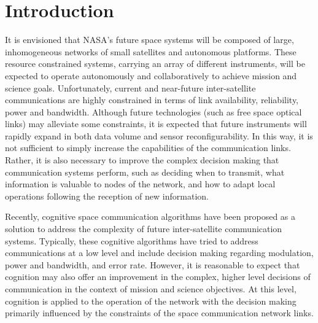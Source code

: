\documentclass[conference]{IEEEtran}
\begin{document}
\section{Introduction}
It is envisioned that NASA's future space systems will be composed of large,
inhomogeneous networks of small satellites and autonomous platforms.  These
resource constrained systems, carrying an array of different instruments, will
be expected to operate autonomously and collaboratively to achieve mission and
science goals.  Unfortunately, current and near-future inter-satellite
communications are highly constrained in terms of link availability,
reliability, power and bandwidth.  Although future technologies (such as free
space optical links) may alleviate some constraints, it is expected that future
instruments will rapidly expand in both data volume and sensor
reconfigurability.  In this way, it is not sufficient to simply increase the
capabilities of the communication links.  Rather, it is also necessary to
improve the complex decision making that communication systems perform, such as
deciding when to transmit, what information is valuable to nodes of the network,
and how to adapt local operations following the reception of new information.

Recently, cognitive space communication algorithms have been proposed as a
solution to address the complexity of future inter-satellite communication
systems.  Typically, these cognitive algorithms have tried to address
communications at a low level and include decision making regarding modulation,
power and bandwidth, and error rate.  However, it is reasonable to expect that
cognition may also offer an improvement in the complex, higher level decisions
of communication in the context of mission and science objectives.  At this
level, cognition is applied to the operation of the network with the decision
making primarily influenced by the constraints of the space communication
network links.
\end{document}
